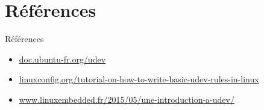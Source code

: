 \documentclass{beamer}
\begin{document}
\section{Références}

 \begin{frame}
\begin{block}{Références} 
	\begin{itemize}
		[circle]
		\item \footnotesize \url{doc.ubuntu-fr.org/udev} \normalsize
		\item \footnotesize \url{linuxconfig.org/tutorial-on-how-to-write-basic-udev-rules-in-linux} \normalsize
		\item \footnotesize \url{www.linuxembedded.fr/2015/05/une-introduction-a-udev/} \normalsize
	\end{itemize}
\end{block}
\end{frame}
      
\end{document}
